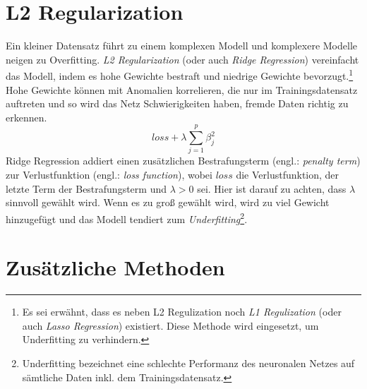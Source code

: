 \section{L2 Regularization}

Ein kleiner Datensatz führt zu einem komplexen Modell und komplexere Modelle neigen zu Overfitting. \textit{L2 Regularization} (oder auch \textit{Ridge Regression}) vereinfacht das Modell, indem es hohe Gewichte bestraft und niedrige Gewichte bevorzugt.\footnote{Es sei erwähnt, dass es neben L2 Regulization noch \textit{L1 Regulization} (oder auch \textit{Lasso Regression}) existiert. Diese Methode wird eingesetzt, um Underfitting zu verhindern.} Hohe Gewichte können mit Anomalien korrelieren, die nur im Trainingsdatensatz auftreten und so wird das Netz Schwierigkeiten haben, fremde Daten richtig zu erkennen. 
\begin{equation}\label{equation:l2}
	loss + \lambda\sum_{j=1}^p\beta_j^2
\end{equation}
Ridge Regression addiert einen zusätzlichen Bestrafungsterm (engl.: \textit{penalty term}) zur Verlustfunktion (engl.: \textit{loss function}), wobei $loss$ die Verlustfunktion, der letzte Term der Bestrafungsterm und $\lambda > 0$ sei. Hier ist darauf zu achten, dass $\lambda$ sinnvoll gewählt wird. Wenn es zu groß gewählt wird, wird zu viel Gewicht hinzugefügt und das Modell tendiert zum \textit{Underfitting}\footnote{Underfitting bezeichnet eine schlechte Performanz des neuronalen Netzes auf sämtliche Daten inkl. dem Trainingsdatensatz.}.\cite{ref:regulization:nagpal}\cite{ref:regulization:gupta}

\section{Zusätzliche Methoden}


